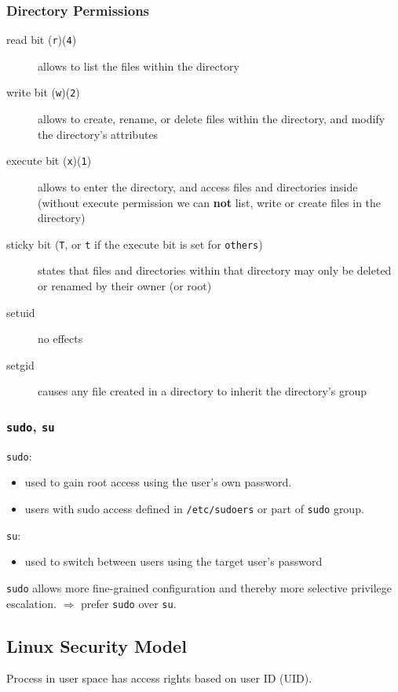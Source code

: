 \subsubsection{Directory Permissions}
\begin{description}
  \item[read bit (\texttt{r})(\texttt{4})] allows to list the files within the directory
  \item[write bit (\texttt{w})(\texttt{2})] allows to create, rename, or delete files
    within the directory, and modify the directory's attributes
  \item[execute bit (\texttt{x})(\texttt{1})] allows  to enter the directory, and access files and directories inside (without execute permission we can \textbf{not} list, write or create files in the directory)
  \item[sticky bit (\texttt{T}, or \texttt{t} if the execute bit is set for
    \texttt{others})] states that files and directories within that directory
    may only be deleted or renamed by their owner (or root)
  \item[setuid] no effects
  \item[setgid] causes any file created in a directory to inherit the
    directory's group
\end{description}

\subsubsection{\texttt{sudo}, \texttt{su}}

\texttt{sudo}:
\begin{itemize}
  \item used to gain root access using the user's own password.
  \item users with sudo access defined in \texttt{/etc/sudoers} or part of \texttt{sudo} group. 
\end{itemize}
\texttt{su}:
\begin{itemize}
  \item used to switch between users using the target user's password
\end{itemize}
\texttt{sudo} allows more fine-grained configuration and thereby more selective
privilege escalation. $\Rightarrow$ prefer \texttt{sudo} over \texttt{su}.

\subsection{Linux Security Model}
Process in user space has access rights based on user ID (UID).

